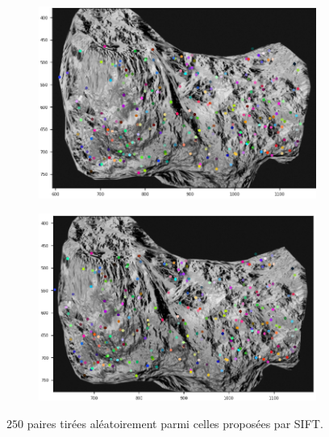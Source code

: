 \documentclass[
	a4paper, %
	10pt, %
	unnumberedsections, %
	twoside, %
]{LTJournalArticle}
\begin{document}
\begin{figure}[H]
	\centering
	\begin{subfigure}[H]{0.45\textwidth}
		\centering
		\includegraphics[width=\textwidth]{images/res1_sift_g.png}
	\end{subfigure}
	\begin{subfigure}[H]{0.45\textwidth}
		\centering
		\includegraphics[width=\textwidth]{images/res1_sift_d.png}
	\end{subfigure}
	\caption{$250$ paires tirées aléatoirement parmi celles proposées par SIFT.}
	\label{figure:fig_syn_sift}
\end{figure}
\end{document}
